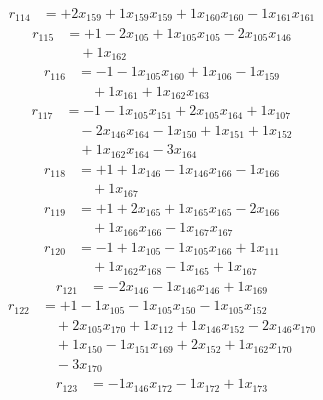 \[\begin{aligned}
r_{114} &= + 2 x_{159} + 1 x_{159} x_{159} + 1 x_{160} x_{160} - 1 x_{161} x_{161}
\end{aligned}\]
\[\begin{aligned}
r_{115} &= + 1 - 2 x_{105} + 1 x_{105} x_{105} - 2 x_{105} x_{146} \\
 &\quad + 1 x_{162}
\end{aligned}\]
\[\begin{aligned}
r_{116} &= - 1 - 1 x_{105} x_{160} + 1 x_{106} - 1 x_{159} \\
 &\quad + 1 x_{161} + 1 x_{162} x_{163}
\end{aligned}\]
\[\begin{aligned}
r_{117} &= - 1 - 1 x_{105} x_{151} + 2 x_{105} x_{164} + 1 x_{107} \\
 &\quad - 2 x_{146} x_{164} - 1 x_{150} + 1 x_{151} + 1 x_{152} \\
 &\quad + 1 x_{162} x_{164} - 3 x_{164}
\end{aligned}\]
\[\begin{aligned}
r_{118} &= + 1 + 1 x_{146} - 1 x_{146} x_{166} - 1 x_{166} \\
 &\quad + 1 x_{167}
\end{aligned}\]
\[\begin{aligned}
r_{119} &= + 1 + 2 x_{165} + 1 x_{165} x_{165} - 2 x_{166} \\
 &\quad + 1 x_{166} x_{166} - 1 x_{167} x_{167}
\end{aligned}\]
\[\begin{aligned}
r_{120} &= - 1 + 1 x_{105} - 1 x_{105} x_{166} + 1 x_{111} \\
 &\quad + 1 x_{162} x_{168} - 1 x_{165} + 1 x_{167}
\end{aligned}\]
\[\begin{aligned}
r_{121} &= - 2 x_{146} - 1 x_{146} x_{146} + 1 x_{169}
\end{aligned}\]
\[\begin{aligned}
r_{122} &= + 1 - 1 x_{105} - 1 x_{105} x_{150} - 1 x_{105} x_{152} \\
 &\quad + 2 x_{105} x_{170} + 1 x_{112} + 1 x_{146} x_{152} - 2 x_{146} x_{170} \\
 &\quad + 1 x_{150} - 1 x_{151} x_{169} + 2 x_{152} + 1 x_{162} x_{170} \\
 &\quad - 3 x_{170}
\end{aligned}\]
\[\begin{aligned}
r_{123} &= - 1 x_{146} x_{172} - 1 x_{172} + 1 x_{173}
\end{aligned}\]
